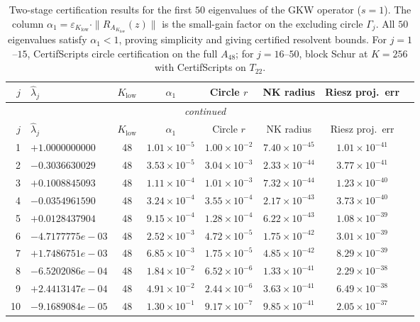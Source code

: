\documentclass[11pt]{article}
\begin{document}
\begin{longtable}{rlcccccc}
\caption{Two-stage certification results for the first $50$ eigenvalues of the GKW operator ($s=1$).
The column $\alpha_1 = \varepsilon_{K_{\mathrm{low}}} \cdot \|R_{A_{K_{\mathrm{low}}}}(z)\|$ is the
small-gain factor on the excluding circle $\Gamma_j$.  All $50$ eigenvalues satisfy $\alpha_1 < 1$,
proving simplicity and giving certified resolvent bounds.
For $j = 1$--$15$, CertifScripts circle certification on the full $A_{48}$;
for $j = 16$--$50$, block Schur at $K = 256$ with CertifScripts on $T_{22}$.}
\label{tab:two-stage-results}\\
\toprule
$j$ & $\hat\lambda_j$ & $K_{\mathrm{low}}$ & $\alpha_1$ & Circle $r$ & NK radius & Riesz proj.~err \\
\midrule
\endfirsthead
\multicolumn{7}{c}{\textit{continued}} \\
\toprule
$j$ & $\hat\lambda_j$ & $K_{\mathrm{low}}$ & $\alpha_1$ & Circle $r$ & NK radius & Riesz proj.~err \\
\midrule
\endhead
1 & $+1.0000000000$ & 48 & $1.01 \times 10^{-5}$ & $1.00 \times 10^{-2}$ & $7.40 \times 10^{-45}$ & $1.01 \times 10^{-41}$ \\
2 & $-0.3036630029$ & 48 & $3.53 \times 10^{-5}$ & $3.04 \times 10^{-3}$ & $2.33 \times 10^{-44}$ & $3.77 \times 10^{-41}$ \\
3 & $+0.1008845093$ & 48 & $1.11 \times 10^{-4}$ & $1.01 \times 10^{-3}$ & $7.32 \times 10^{-44}$ & $1.23 \times 10^{-40}$ \\
4 & $-0.0354961590$ & 48 & $3.24 \times 10^{-4}$ & $3.55 \times 10^{-4}$ & $2.17 \times 10^{-43}$ & $3.73 \times 10^{-40}$ \\
5 & $+0.0128437904$ & 48 & $9.15 \times 10^{-4}$ & $1.28 \times 10^{-4}$ & $6.22 \times 10^{-43}$ & $1.08 \times 10^{-39}$ \\
6 & $-4.7177775e-03$ & 48 & $2.52 \times 10^{-3}$ & $4.72 \times 10^{-5}$ & $1.75 \times 10^{-42}$ & $3.01 \times 10^{-39}$ \\
7 & $+1.7486751e-03$ & 48 & $6.85 \times 10^{-3}$ & $1.75 \times 10^{-5}$ & $4.85 \times 10^{-42}$ & $8.29 \times 10^{-39}$ \\
8 & $-6.5202086e-04$ & 48 & $1.84 \times 10^{-2}$ & $6.52 \times 10^{-6}$ & $1.33 \times 10^{-41}$ & $2.29 \times 10^{-38}$ \\
9 & $+2.4413147e-04$ & 48 & $4.91 \times 10^{-2}$ & $2.44 \times 10^{-6}$ & $3.63 \times 10^{-41}$ & $6.49 \times 10^{-38}$ \\
10 & $-9.1689084e-05$ & 48 & $1.30 \times 10^{-1}$ & $9.17 \times 10^{-7}$ & $9.85 \times 10^{-41}$ & $2.05 \times 10^{-37}$ \\

\end{longtable}
\end{document}
